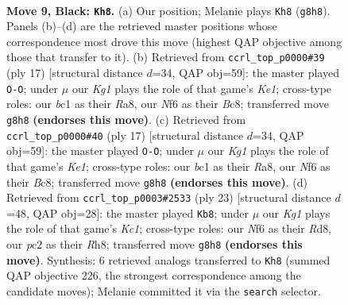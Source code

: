 \documentclass[11pt]{article}
\begin{document}
\clearpage

\begin{figure}[p]\centering
\begin{subfigure}{0.46\textwidth}\centering
\resizebox{\linewidth}{!}{%
\newchessgame
\chessboard[
  setfen={r1bq1rk1/p1p2ppp/2pp1n2/4p3/4P2P/2PP1N2/P1P2PP1/R1BQ1RK1 b - - 0 9},
  showmover=false,
  pgfstyle=straightmove, color=movearrow, markmove={g8-h8}
]}
\caption{}
\end{subfigure}\hfill
\begin{subfigure}{0.46\textwidth}\centering
\resizebox{\linewidth}{!}{%
\newchessgame
\chessboard[
  setfen={r1b1k2r/p1p1qppp/2pp1n2/4p3/4P3/2PP1N1P/P1P2PP1/R1BQ1RK1 b kq - 0 9},
  showmover=false,
  pgfstyle=straightmove, color=movearrow, markmove={e8-g8}
]}
\caption{}
\end{subfigure}
\\[4pt]
\begin{subfigure}{0.46\textwidth}\centering
\resizebox{\linewidth}{!}{%
\newchessgame
\chessboard[
  setfen={r1b1k2r/p1p1qppp/2pp1n2/4p3/4P3/2PP1N1P/P1P2PP1/R1BQ1RK1 b kq - 0 9},
  showmover=false,
  pgfstyle=straightmove, color=movearrow, markmove={e8-g8}
]}
\caption{}
\end{subfigure}\hfill
\begin{subfigure}{0.46\textwidth}\centering
\resizebox{\linewidth}{!}{%
\newchessgame
\chessboard[
  setfen={2kr3r/1ppnqppp/p1pb4/4p3/2P1P3/2PP1N2/P4PPP/R1BQ1RK1 b - - 0 12},
  showmover=false,
  pgfstyle=straightmove, color=movearrow, markmove={c8-b8}
]}
\caption{}
\end{subfigure}
\caption{\textbf{Move 9, Black: \texttt{Kh8}.} (a) Our position; Melanie plays \texttt{Kh8} (\texttt{g8h8}). Panels (b)--(d) are the retrieved master positions whose correspondence most drove this move (highest QAP objective among those that transfer to it). (b) Retrieved from \texttt{ccrl\_top\_p0000\#39} (ply 17) [structural distance $d$=34, QAP obj=59]: the master played \texttt{O-O}; under $\mu$ our \emph{Kg1} plays the role of that game's \emph{Ke1}; cross-type roles: our \emph{b}c1 as their \emph{R}a8, our \emph{N}f6 as their \emph{B}c8; transferred move \texttt{g8h8} \textbf{(endorses this move)}. (c) Retrieved from \texttt{ccrl\_top\_p0000\#40} (ply 17) [structural distance $d$=34, QAP obj=59]: the master played \texttt{O-O}; under $\mu$ our \emph{Kg1} plays the role of that game's \emph{Ke1}; cross-type roles: our \emph{b}c1 as their \emph{R}a8, our \emph{N}f6 as their \emph{B}c8; transferred move \texttt{g8h8} \textbf{(endorses this move)}. (d) Retrieved from \texttt{ccrl\_top\_p0003\#2533} (ply 23) [structural distance $d$=48, QAP obj=28]: the master played \texttt{Kb8}; under $\mu$ our \emph{Kg1} plays the role of that game's \emph{Kc1}; cross-type roles: our \emph{N}f6 as their \emph{R}d8, our \emph{p}c2 as their \emph{R}h8; transferred move \texttt{g8h8} \textbf{(endorses this move)}. Synthesis: 6 retrieved analogs transferred to \texttt{Kh8} (summed QAP objective 226, the strongest correspondence among the candidate moves); Melanie committed it via the \texttt{search} selector.}
\label{fig:thought-m17}
\end{figure}
\end{document}

